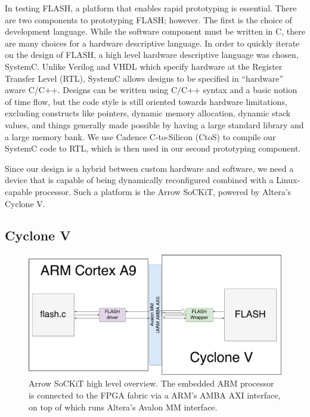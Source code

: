 \documentclass{sig-alternate-10pt}
\begin{document}
In testing FLASH, a platform that enables rapid prototyping is essential.
There are two components to prototyping FLASH; however. The first is the
choice of development language. While the software component must be written
in C, there are many choices for a hardware descriptive language. In order
to quickly iterate on the design of FLASH, a high level hardware descriptive
language was chosen, SystemC. Unlike Verilog and VHDL which specify hardware
at the Register Transfer Level (RTL), SystemC allows designs to
be specified in ``hardware'' aware C/C++. Designs can be written using C/C++
syntax and a basic notion of time flow, but the code style is still oriented
towards hardware limitations, excluding constructs like pointers, dynamic
memory allocation, dynamic stack values, and things generally made possible
by having a large standard library and a large memory bank. We use Cadence
C-to-Silicon (CtoS) to compile our SystemC code to RTL, which is then used
in our second prototyping component.

Since our design is a hybrid between custom hardware and software, we need a device that is capable of being dynamically reconfigured combined with a Linux-capable processor. Such a platform is the Arrow SoCKiT, powered by Altera's Cyclone V.

\subsection{Cyclone V}
\begin{figure}
	\begin{center}
		\includegraphics[width=0.9\linewidth]{fig/sockit-architecture.png}
		\caption{
			Arrow SoCKiT high level overview. The embedded ARM processor is connected to the FPGA fabric via a ARM's AMBA AXI interface, on top of which runs Altera's Avalon MM interface.
		}
		\label{fig:sockit_overview}
	\end{center}
\end{figure}
\end{document}
